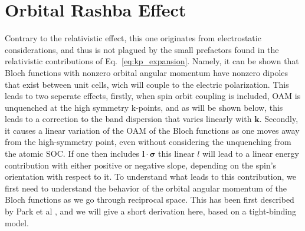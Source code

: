 \section{Orbital Rashba Effect}
Contrary to the relativistic effect, this one originates from electrostatic considerations, and thus is not plagued by the small prefactors found in the relativistic contributions of Eq.~\ref{eq:kp_expansion}. Namely, it can be shown that Bloch functions with nonzero orbital angular momentum have nonzero dipoles that exist between unit cells, wich will couple to the electric polarization. This leads to two seperate effects, firstly, when spin orbit coupling is included, OAM is unquenched at the high symmetry k-points, and as will be shown below, this leads to a correction to the band dispersion that varies linearly with $\bm{k}$. Secondly, it causes a linear variation of the OAM of the Bloch functions as one moves away from the high-symmetry point, even without considering the unquenching from the atomic SOC. If one then includes $\bm{l}\cdot\bm{\sigma}$ this linear $l$ will lead to a linear energy contribution with either positive or negative slope, depending on the spin's orientation with respect to it.
To understand what leads to this contribution, we first need to understand the behavior of the orbital angular momentum of the Bloch functions as we go through reciprocal space. This has been first described by Park et al \cite{Park2011}, and we will give a short derivation here, based on a tight-binding model.
